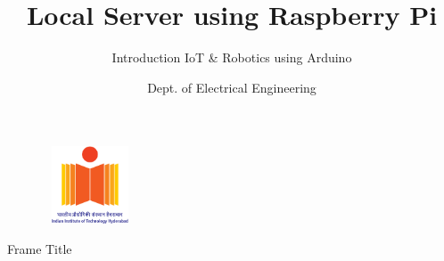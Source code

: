 \documentclass{beamer}
\title[IIT Hyderabad]{Local Server using Raspberry Pi}
\author[ National Resource Centre] {Introduction IoT \& Robotics using Arduino }
\institute[]{\textbf{Dr. G.V.V.Sharma}}
\date{Dept. of Electrical Engineering}
\begin{document}
\begin{frame}
	\begin{center}
  \titlepage 
      \begin{figure}[h]
  \includegraphics[width=2.8cm,height=2.3cm] {GIMG/iith.png}
      \end{figure}
  \end{center}
\end{frame}


\begin{frame}{Frame Title}
    
\end{frame}
\end{document}
